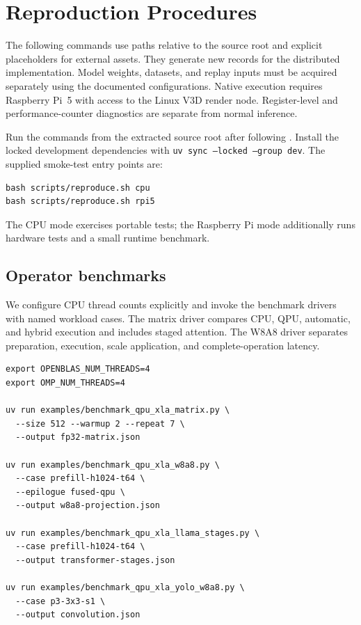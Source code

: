 \documentclass[sigplan,screen,review]{acmart}
\begin{document}
\section{Reproduction Procedures}
\label{app:commands}

The following commands use paths relative to the source root and explicit placeholders for external assets. They generate new records for the distributed implementation. Model weights, datasets, and replay inputs must be acquired separately using the documented configurations. Native execution requires Raspberry Pi~5 with access to the Linux V3D render node. Register-level and performance-counter diagnostics are separate from normal inference.

Run the commands from the extracted source root after following
. Install the locked development dependencies with
\texttt{uv sync --locked --group dev}. The supplied smoke-test entry
points are:
\begin{verbatim}
bash scripts/reproduce.sh cpu
bash scripts/reproduce.sh rpi5
\end{verbatim}
The CPU mode exercises portable tests; the Raspberry Pi mode additionally
runs hardware tests and a small runtime benchmark.

\subsection{Operator benchmarks}

We configure CPU thread counts explicitly and invoke the benchmark drivers with named workload cases. The matrix driver compares CPU, QPU, automatic, and hybrid execution and includes staged attention. The W8A8 driver separates preparation, execution, scale application, and complete-operation latency.

{\footnotesize
\begin{verbatim}
export OPENBLAS_NUM_THREADS=4
export OMP_NUM_THREADS=4

uv run examples/benchmark_qpu_xla_matrix.py \
  --size 512 --warmup 2 --repeat 7 \
  --output fp32-matrix.json

uv run examples/benchmark_qpu_xla_w8a8.py \
  --case prefill-h1024-t64 \
  --epilogue fused-qpu \
  --output w8a8-projection.json

uv run examples/benchmark_qpu_xla_llama_stages.py \
  --case prefill-h1024-t64 \
  --output transformer-stages.json

uv run examples/benchmark_qpu_xla_yolo_w8a8.py \
  --case p3-3x3-s1 \
  --output convolution.json
\end{verbatim}
}
\end{document}

